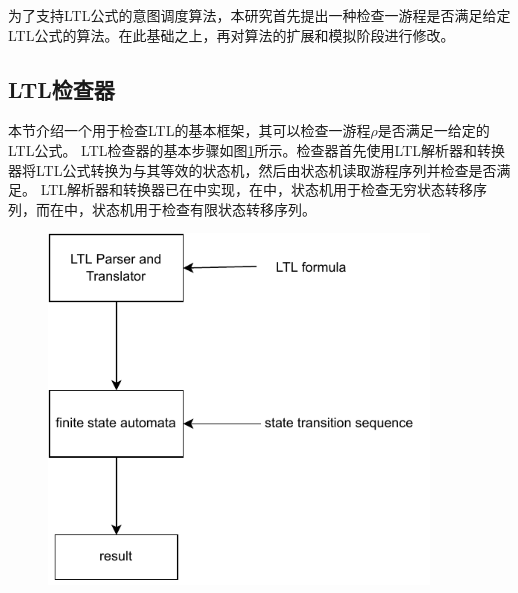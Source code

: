 为了支持LTL公式的意图调度算法，本研究首先提出一种检查一游程是否满足给定LTL公式的算法。在此基础之上，再对\SA 算法的扩展和模拟阶段进行修改。

\subsection{LTL检查器}
本节介绍一个用于检查LTL的基本框架，其可以检查一游程$\rho$是否满足一给定的LTL公式。
LTL检查器的基本步骤如图\ref{fig:translator}所示。检查器首先使用LTL解析器和转换器将LTL公式转换为与其等效的状态机，然后由状态机读取游程序列并检查是否满足。
LTL解析器和转换器已在\cite{DBLP:books/daglib/0020982,DBLP:journals/jlap/HuangC22}中实现，在\cite{DBLP:books/daglib/0020982}中，状态机用于检查无穷状态转移序列，而在\cite{DBLP:journals/jlap/HuangC22}中，状态机用于检查有限状态转移序列。

\begin{figure}[htb]
\centering
\includegraphics[width=0.9\textwidth]{./figs/translator}
\label{fig:translator}
\end{figure}

